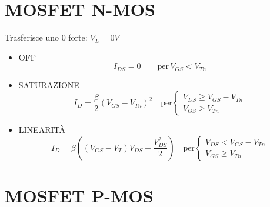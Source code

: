 \documentclass{article}
\begin{document}
\bigbreak%
\section*{MOSFET N-MOS}

\begin{minipage}{0.4\textwidth}
\end{minipage}
\begin{minipage}{0.5\textwidth}
    Trasferisce uno 0 forte: $V_L = 0V$
    \begin{itemize}
        \item OFF
            \[ I_{DS} = 0 \qquad \text{per}\, V_{GS} < V_{Tn} \]
        \item SATURAZIONE
            \[ I_D  = \frac{\beta}{2} {(V_{GS} - V_{Tn})}^2 \quad\text{per}
            \begin{cases}
                V_{DS} \ge V_{GS} - V_{Tn}\\
                V_{GS} \ge V_{Tn}
            \end{cases}
        \]
        \item LINEARITÀ
            \[
                I_D = \beta\left((V_{GS} - V_T)V_{DS} - \frac{V_{DS}^2}{2}\right)
                \quad\text{per}
                \begin{cases}
                    V_{DS} < V_{GS} - V_{Tn}\\
                    V_{GS} \ge V_{Tn}
                \end{cases}
            \]
    \end{itemize}
\end{minipage}

\bigbreak%
\section*{MOSFET P-MOS}
\end{document}
